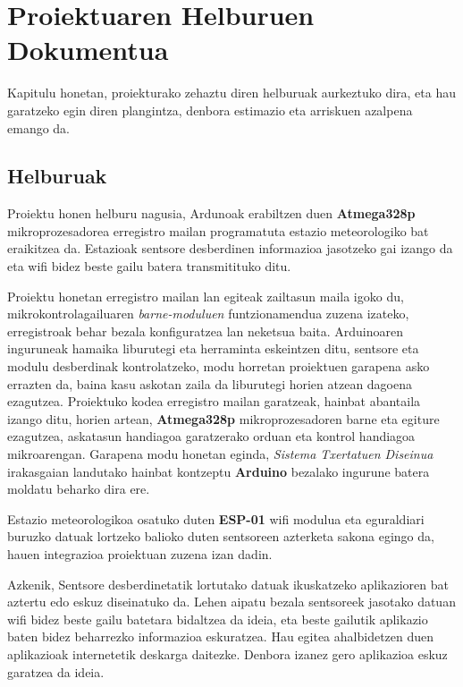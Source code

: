 \chapter{Proiektuaren Helburuen Dokumentua}

\vspace{4cm}

Kapitulu honetan, proiekturako zehaztu diren helburuak aurkeztuko dira, eta hau garatzeko egin diren plangintza, denbora estimazio eta arriskuen azalpena emango da.
\newpage

\section{Helburuak}

Proiektu honen helburu nagusia, Ardunoak erabiltzen duen \textbf{Atmega328p} mikroprozesadorea erregistro mailan programatuta estazio meteorologiko bat eraikitzea da. Estazioak sentsore desberdinen informazioa jasotzeko gai izango da eta wifi bidez beste gailu batera transmitituko ditu.

Proiektu honetan erregistro mailan lan egiteak zailtasun maila igoko du, mikrokontrolagailuaren \textit{barne-moduluen} funtzionamendua zuzena izateko, erregistroak behar bezala konfiguratzea lan neketsua baita. Arduinoaren inguruneak hamaika liburutegi eta herraminta eskeintzen ditu, sentsore eta modulu desberdinak kontrolatzeko, modu horretan proiektuen garapena asko errazten da, baina kasu askotan zaila da liburutegi horien atzean dagoena ezagutzea. Proiektuko kodea erregistro mailan garatzeak, hainbat abantaila izango ditu, horien artean, \textbf{Atmega328p} mikroprozesadoren barne eta egiture ezagutzea, askatasun handiagoa garatzerako orduan eta kontrol handiagoa mikroarengan. Garapena modu honetan eginda, \textit{Sistema Txertatuen Diseinua} irakasgaian landutako hainbat kontzeptu \textbf{Arduino} bezalako ingurune batera moldatu beharko dira ere.

Estazio meteorologikoa osatuko duten \textbf{ESP-01} wifi modulua eta eguraldiari buruzko datuak lortzeko balioko duten sentsoreen azterketa sakona egingo da, hauen integrazioa proiektuan zuzena izan dadin.

Azkenik, Sentsore desberdinetatik lortutako datuak ikuskatzeko aplikazioren bat aztertu edo eskuz diseinatuko da. Lehen aipatu bezala sentsoreek jasotako datuan wifi bidez beste gailu batetara bidaltzea da ideia, eta beste gailutik aplikazio baten bidez beharrezko informazioa eskuratzea. Hau egitea ahalbidetzen duen aplikazioak internetetik deskarga daitezke. Denbora izanez gero aplikazioa eskuz garatzea da ideia.

